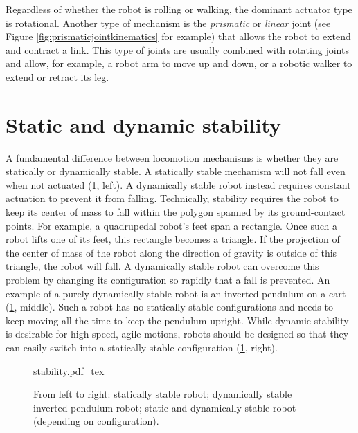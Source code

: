 Regardless of whether the robot is rolling or walking, the dominant actuator type is rotational. Another type of mechanism is the \emph{prismatic} or \emph{linear} joint (see Figure \ref{fig:prismaticjointkinematics} for example) that allows the robot to extend and contract a link. This type of joints are usually combined with rotating joints and allow, for example, a robot arm to move up and down, or a robotic walker to extend or retract its leg. 


\section{Static and dynamic stability}\label{sec:stability}

A fundamental difference between locomotion mechanisms is whether they are statically or dynamically stable. A statically stable mechanism will not fall even when not actuated (\cref{fig:stability}, left). A dynamically stable robot instead requires constant actuation to prevent it from falling. Technically, stability requires the robot to keep its center of mass to fall within the polygon spanned by its ground-contact points. For example, a quadrupedal robot's feet span a rectangle. Once such a robot lifts one of its feet, this rectangle becomes a triangle. If the projection of the center of mass of the robot along the direction of gravity is outside of this triangle, the robot will fall. A dynamically stable robot can overcome this problem by changing its configuration so rapidly that a fall is prevented. An example of a purely dynamically stable robot is an inverted pendulum on a cart (\cref{fig:stability}, middle). Such a robot has no statically stable configurations and needs to keep moving all the time to keep the pendulum upright. While dynamic stability is desirable for high-speed, agile motions, robots should be designed so that they can easily switch into a statically stable configuration (\cref{fig:stability}, right).

\begin{figure}
    \centering
    \def\svgwidth{\textwidth}
    {stability.pdf_tex}
    \caption{From left to right: statically stable robot; dynamically stable inverted pendulum robot; static and dynamically stable robot (depending on configuration).}
    \label{fig:stability}
\end{figure}

